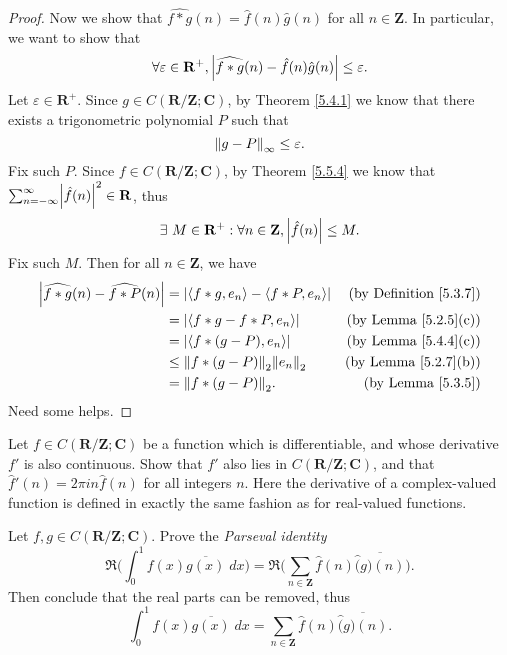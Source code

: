\begin{proof}
    Now we show that \(\widehat{f * g}(n) = \hat{f}(n) \hat{g}(n)\) for all \(n \in \mathbf{Z}\).
    In particular, we want to show that
    \[
        \forall \varepsilon \in \mathbf{R}^+, \abs*{\widehat{f * g}(n) - \hat{f}(n) \hat{g}(n)} \leq \varepsilon.
    \]
    Let \(\varepsilon \in \mathbf{R}^+\).
    Since \(g \in C(\mathbf{R} / \mathbf{Z} ; \mathbf{C})\), by Theorem \ref{5.4.1} we know that there exists a trigonometric polynomial \(P\) such that
    \[
        \norm*{g - P}_{\infty} \leq \varepsilon.
    \]
    Fix such \(P\).
    Since \(f \in C(\mathbf{R} / \mathbf{Z} ; \mathbf{C})\), by Theorem \ref{5.5.4} we know that \(\sum_{n = -\infty}^\infty \abs*{\hat{f}(n)}^2 \in \mathbf{R}\), thus
    \[
        \exists\ M \in \mathbf{R}^+ : \forall n \in \mathbf{Z}, \abs*{\hat{f}(n)} \leq M.
    \]
    Fix such \(M\).
    Then for all \(n \in \mathbf{Z}\), we have
    \begin{align*}
        \abs*{\widehat{f * g}(n) - \widehat{f * P}(n)} & = \abs*{\inner*{f * g, e_n} - \inner*{f * P, e_n}} & \text{(by Definition \ref{5.3.7})} \\
                                                       & = \abs*{\inner*{f * g - f * P, e_n}}               & \text{(by Lemma \ref{5.2.5}(c))}   \\
                                                       & = \abs*{\inner*{f * (g - P), e_n}}                 & \text{(by Lemma \ref{5.4.4}(c))}   \\
                                                       & \leq \norm*{f * (g - P)}_2 \norm*{e_n}_2           & \text{(by Lemma \ref{5.2.7}(b))}   \\
                                                       & = \norm*{f * (g - P)}_2.                           & \text{(by Lemma \ref{5.3.5})}
    \end{align*}
    Need some helps.
\end{proof}

\begin{exercise}\label{ex 5.5.4}
    Let \(f \in C(\mathbf{R} / \mathbf{Z} ; \mathbf{C})\) be a function which is differentiable, and whose derivative \(f'\) is also continuous.
    Show that \(f'\) also lies in \(C(\mathbf{R} / \mathbf{Z} ; \mathbf{C})\), and that \(\hat{f}'(n) = 2 \pi i n \hat{f}(n)\) for all integers \(n\).
    Here the derivative of a complex-valued function is defined in exactly the same fashion as for real-valued functions.
\end{exercise}

\begin{exercise}\label{ex 5.5.5}
    Let \(f, g \in C(\mathbf{R} / \mathbf{Z} ; \mathbf{C})\).
    Prove the \emph{Parseval identity}
    \[
        \Re\bigg(\int_0^1 f(x) \overline{g(x)} \; dx\bigg) = \Re\bigg(\sum_{n \in \mathbf{Z}} \hat{f}(n) \overline{\hat(g)(n)}\bigg).
    \]
    Then conclude that the real parts can be removed, thus
    \[
        \int_0^1 f(x) \overline{g(x)} \; dx = \sum_{n \in \mathbf{Z}} \hat{f}(n) \overline{\hat(g)(n)}.
    \]
\end{exercise}

